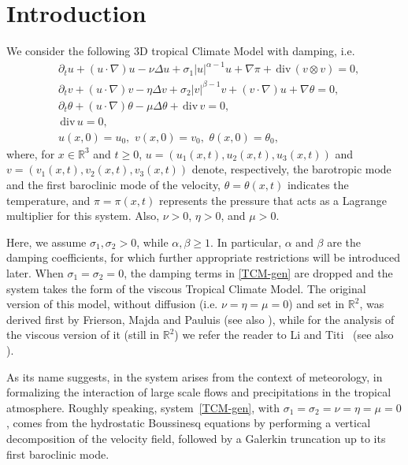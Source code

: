 \documentclass[a4paper]{article}
\newcommand{\D}{\partial}
\newcommand{\R}{\mathbb{R}}
\providecommand{\dv}{\,\mathrm{div}\,}
\begin{document}
\section{Introduction} \label{sec:intro}
%
We consider the following 3D tropical Climate Model with damping, i.e.
%
\begin{equation}\label{TCM-gen}
  \begin{aligned}
    &\D_t u+ (u\cdot \nabla) u -\nu\Delta u + \sigma_1 |u|^{\alpha -1}u +\nabla \pi+\dv  (v \otimes v)=0,\\
    &\D_t v+ (u \cdot \nabla) v -\eta\Delta v + \sigma_2 |v|^{\beta -1}v + (v\cdot \nabla) u  +\nabla\theta =0,\\
    & \D_t \theta + (u \cdot \nabla) \theta  -\mu \Delta \theta  + \dv  v =0,\\
    &\dv  u = 0,\\
    & u (x, 0) =u_0,\,\, v (x, 0)=v_0,\,\, \theta (x, 0)=\theta_0,
  \end{aligned}
\end{equation}
where, for $x\in \R^3$ and $t \geq 0$, $u = (u_1(x,t), u_2(x,t), u_3(x,t))$
and $v = (v_1(x, t), v_2(x, t), v_3(x,t))$ denote, respectively, the barotropic mode
and the first baroclinic mode of the velocity, $\theta = \theta(x,t)$ indicates
the temperature, and $\pi=\pi(x,t)$ represents the pressure that acts as a Lagrange multiplier for this system.
Also, $\nu>0$, $\eta>0$, and  $\mu>0$.

Here, we assume $\sigma_1, \sigma_2 > 0$, while
$\alpha, \beta \geq 1$. In particular, $\alpha$ and $\beta$ are the
damping coefficients, for which further appropriate restrictions will
be introduced later.
When $\sigma_1=\sigma_2=0$, the damping terms in \eqref{TCM-gen} are
dropped and the system takes the form of the viscous Tropical Climate
Model. The original version of this model, without diffusion
(i.e. $\nu = \eta =\mu =0$) and set in $\mathbb{R}^2$, was
derived first by Frierson, Majda and Pauluis \cite{Frierson} (see also
\cite{Maj}), while for the analysis of the viscous version of it
(still in $\mathbb{R}^2$) we refer the reader to Li and
Titi~\cite{Li-Titi} (see also \cite{Li-Titi-1}).

As its name suggests, in \cite{Frierson} the system arises from the
context of meteorology, in formalizing the interaction of large scale
flows and precipitations in the tropical atmosphere. Roughly speaking,
system~\eqref{TCM-gen}, with $\sigma_1=\sigma_2=\nu = \eta =\mu =0$,
comes from the hydrostatic Boussinesq equations by performing a vertical
decomposition of the velocity field, followed by a Galerkin truncation
up to its first baroclinic mode.
\end{document}
